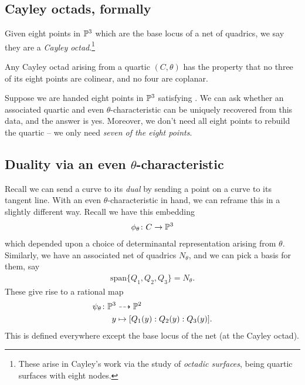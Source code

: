 \documentclass[11pt]{amsart}
\begin{document}
\subsection{Cayley octads, formally}

\begin{definition}
Given eight points in $\P^3$ which are the base locus of a net of quadrics, we say they are a \textit{Cayley octad}.\footnote{These arise in Cayley's work via the study of \textit{octadic surfaces}, being quartic surfaces with eight nodes.}
\end{definition}


\begin{proposition}
\label{prop:colinearity-coplanarity-cayley-octads}
Any Cayley octad arising from a quartic $(C,\theta)$ has the property that no three of its eight points are colinear, and no four are coplanar.
\end{proposition}

Suppose we are handed eight points in $\P^3$ satisfying . We can ask whether an associated quartic and even $\theta$-characteristic can be uniquely recovered from this data, and the answer is yes. Moreover, we don't need all eight points to rebuild the quartic -- we only need \textit{seven of the eight points}.

\subsection{Duality via an even \texorpdfstring{$\theta$}{theta}-characteristic}

Recall we can send a curve to its \textit{dual} by sending a point on a curve to its tangent line. With an even $\theta$-characteristic in hand, we can reframe this in a slightly different way. Recall we have this embedding
\begin{align*}
    \phi_\theta \colon C \to \P^3
\end{align*}
which depended upon a choice of determinantal representation arising from $\theta$. Similarly, we have an associated net of quadrics $N_\theta$, and we can pick a basis for them, say
\begin{align*}
    \text{span}\{Q_1,Q_2,Q_3\} = N_\theta.
\end{align*}
These give rise to a rational map
\begin{align*}
    \psi_\theta \colon \P^3 &\dashto \P^2 \\
    y &\mapsto [Q_1(y) : Q_2(y) : Q_3(y)].
\end{align*}
%
This is defined everywhere except the base locus of the net (at the Cayley octad).
\end{document}

